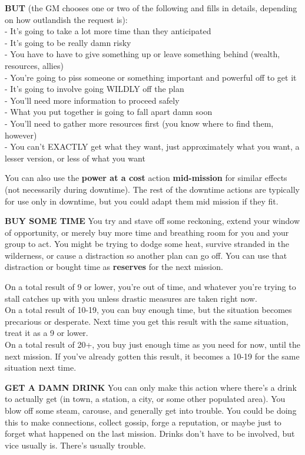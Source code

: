 \textbf{BUT} (the GM chooses one or two of the following and fills in details, depending on how outlandish the request is):\\
-    It’s going to take a lot more time than they anticipated\\
-    It’s going to be really damn risky\\
-    You have to have to give something up or leave something behind (wealth, resources, allies)\\
-    You’re going to piss someone or something important and powerful off to get it\\
-    It’s going to involve going WILDLY off the plan\\
-    You’ll need more information to proceed safely\\
-    What you put together is going to fall apart damn soon\\
-    You’ll need to gather more resources first (you know where to find them, however)\\
-    You can’t EXACTLY get what they want, just approximately what you want, a lesser version, or less of what you want 

You can also use the \textbf{power at a cost} action \textbf{mid-mission} for similar effects (not necessarily during downtime). The rest of the downtime actions are typically for use only in downtime, but you could adapt them mid mission if they fit.


\textbf{BUY SOME TIME}
You try and stave off some reckoning, extend your window of opportunity, or merely buy more time and breathing room for you and your group to act. You might be trying to dodge some heat, survive stranded in the wilderness, or cause a distraction so another plan can go off. You can use that distraction or bought time as \textbf{reserves} for the next mission.

On a total result of 9 or lower, you’re out of time, and whatever you’re trying to stall catches up with you unless drastic measures are taken right now.\\
On a total result of 10-19, you can buy enough time, but the situation becomes precarious or desperate. Next time you get this result with the same situation, treat it as a 9 or lower.\\
On a total result of 20+, you buy just enough time as you need for now, until the next mission. If you’ve already gotten this result, it becomes a 10-19 for the same situation next time.

\textbf{GET A DAMN DRINK}
You can only make this action where there’s a drink to actually get (in town, a station, a city, or some other populated area). You blow off some steam, carouse, and generally get into trouble. You could be doing this to make connections, collect gossip, forge a reputation, or maybe just to forget what happened on the last mission. Drinks don’t have to be involved, but vice usually is. There’s usually trouble.

